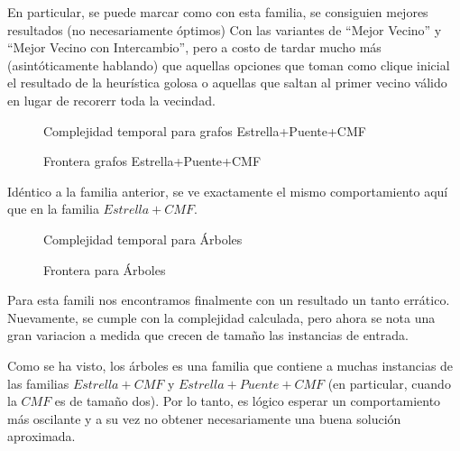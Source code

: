 \par En particular, se puede marcar como con esta familia, se consiguien mejores resultados (no
    necesariamente \'optimos) Con las variantes de ``Mejor Vecino'' y ``Mejor Vecino con Intercambio'',
    pero a costo de tardar mucho m\'as (asint\'oticamente hablando) que aquellas opciones que
    toman como clique inicial el resultado de la heur\'istica golosa o aquellas que saltan
    al primer vecino v\'alido en lugar de recorerr toda la vecindad.

\begin{figure}[H]
    \centering
    \fontsize{7}{10}\selectfont
    \resizebox{0.8\textwidth}{!}{}
    \caption{Complejidad temporal para grafos Estrella+Puente+CMF}
\end{figure}

\begin{figure}[H]
    \centering
    \fontsize{7}{10}\selectfont
    \resizebox{0.8\textwidth}{!}{}
    \caption{Frontera grafos Estrella+Puente+CMF}
\end{figure}

\bigskip

\par Id\'entico a la familia anterior, se ve exactamente el mismo comportamiento
    aqu\'i que en la familia $Estrella+CMF$.

\begin{figure}[H]
    \centering
    \fontsize{7}{10}\selectfont
    \resizebox{0.8\textwidth}{!}{}
    \caption{Complejidad temporal para \'Arboles}
\end{figure}

\begin{figure}[H]
    \centering
    \fontsize{7}{10}\selectfont
    \resizebox{0.8\textwidth}{!}{}
    \caption{Frontera para \'Arboles}
\end{figure}

\bigskip

\par Para esta famili nos encontramos finalmente con un resultado un tanto err\'atico.
    Nuevamente, se cumple con la complejidad calculada, pero ahora se nota
    una gran variacion a medida que crecen de tama\~no las instancias de entrada.

\par Como se ha visto, los \'arboles es una familia que contiene a muchas instancias de
    las familias $Estrella+CMF$ y $Estrella+Puente+CMF$ (en particular, cuando la $CMF$
    es de tama\~no dos). Por lo tanto, es l\'ogico esperar un comportamiento m\'as
    oscilante y a su vez no obtener necesariamente una buena soluci\'on aproximada.

